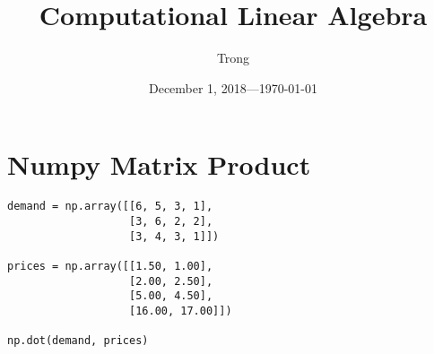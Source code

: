 \documentclass[10pt]{article}
\title{Computational Linear Algebra}
\author{Trong}
\date{December 1, 2018---\today}
\theoremstyle{plain}
\theoremstyle{definition}
\theoremstyle{remark}
\newcommand{\0}{\varnothing}
\newcommand{\<}{\langle}
\renewcommand{\>}{\rangle}
\begin{document}
\sloppy
\maketitle

\tableofcontents

\section{Numpy Matrix Product}

\begin{lstlisting}
demand = np.array([[6, 5, 3, 1],
                   [3, 6, 2, 2],
                   [3, 4, 3, 1]])

prices = np.array([[1.50, 1.00],
                   [2.00, 2.50],
                   [5.00, 4.50],
                   [16.00, 17.00]])

np.dot(demand, prices)
\end{lstlisting}
\end{document}
